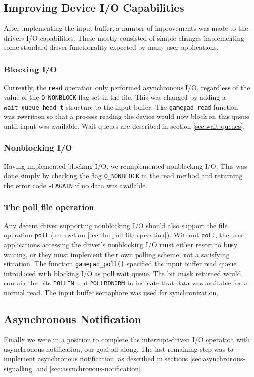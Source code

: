 
\subsection{Improving Device I/O Capabilities}
After implementing the input buffer, a number of improvements was made to the drivers I/O capabilities. These mostly consisted of simple changes implementing some standard driver functionality expected by many user applications.

\subsubsection{Blocking I/O}
Currently, the \texttt{read} operation only performed asynchronous I/O, regardless of the value of the \texttt{O\_NONBLOCK} flag set in the file. This was changed by adding a \texttt{wait\_queue\_head\_t} structure to the input buffer. The \texttt{gamepad\_read} function was rewritten so that a process reading the device would now block on this queue until input was available. Wait queues are described in section \ref{sec:wait-queues}.

\subsubsection{Nonblocking I/O}
Having implemented blocking I/O, we reimplemented nonblocking I/O. This was done simply by checking the flag \texttt{O\_NONBLOCK} in the read method and returning the error code \texttt{-EAGAIN} if no data was available.

\subsubsection{The poll file operation}
Any decent driver supporting nonblocking I/O should also support the file operation \texttt{poll} (see section \ref{sec:the-poll-file-operation}). Without \texttt{poll}, the user applications accessing the driver's nonblocking I/O must either resort to busy waiting, or they must implement their own polling scheme, not a satisfying situation. The function \texttt{gamepad\_poll()} specified the input buffer read queue introduced with blocking I/O as poll wait queue. The bit mask returned would contain the bits \texttt{POLLIN} and \texttt{POLLRDNORM} to indicate that data was available for a normal read. The input buffer semaphore was used for synchronization.

\subsection{Asynchronous Notification}
Finally we were in a position to complete the interrupt-driven I/O operation with asynchronous notification, our goal all along. The last remaining step was to implement asynchronous notification, as described in sections \ref{sec:asynchronous-signalling} and \ref{sec:asynchronous-notification}.


